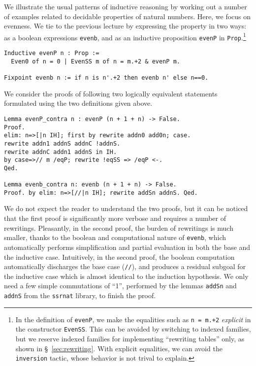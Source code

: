 \documentclass[blockstyle,preprint]{sigplanconf}
\newcommand{\is}[1]{\textcolor{blue}{(Ilya: {#1})}}
\newcommand{\an}[1]{\textcolor{red}{(Aleks: {#1})}}
\newcommand{\code}[1]{\lstinline{#1}}
\begin{document}
We illustrate the usual patterns of inductive reasoning by working out
a number of examples related to decidable properties of natural
numbers. Here, we focus on evenness. We tie to the previous lecture by
expressing the property in two ways: as a boolean expressions
\code{evenb}, and as an inductive proposition \code{evenP} in
\code{Prop}.\footnote{In the definition of \code{evenP}, we make the
  equalities such as \code{n = m.+2} \emph{explicit} in the
  constructor \code{EvenSS}. This can be avoided by switching to
  indexed families, but we reserve indexed families for implementing
  ``rewriting tables'' only, as shown in \S~\ref{sec:rewriting}.
%
  With explicit equalities, we can avoid the \code{inversion} tactic,
  whose behavior is not trival to explain.}
%
\begin{lstlisting}
Inductive evenP n : Prop :=
  Even0 of n = 0 | EvenSS m of n = m.+2 & evenP m.

Fixpoint evenb n := if n is n'.+2 then evenb n' else n==0.
\end{lstlisting}
%
We consider the proofs of following two logically equivalent
statements formulated using the two definitions given above.
%
%
%
\begin{lstlisting}
Lemma evenP_contra n : evenP (n + 1 + n) -> False.
Proof.
elim: n=>[|n IH]; first by rewrite addn0 add0n; case.
rewrite addn1 addnS addnC !addnS. 
rewrite addnC addn1 addnS in IH.
by case=>// m /eqP; rewrite !eqSS => /eqP <-.
Qed.

Lemma evenb_contra n: evenb (n + 1 + n) -> False.
Proof. by elim: n=>[//|n IH]; rewrite addSn addnS. Qed.
\end{lstlisting}
%
We do not expect the reader to understand the two proofs, but it can
be noticed that the first proof is significantly more verbose and
requires a number of rewritings. Pleasantly, in the second proof, the
burden of rewritings is much smaller, thanks to the boolean and
computational nature of \code{evenb}, which automatically performs
simplification and partial evaluation in both the base and the
inductive case. Intuitively, in the second proof, the boolean
computation automatically discharges the base case (\code{//}), and
produces a residual subgoal for the inductive case which is almost
identical to the induction hypothesis. We only need a few simple
commutations of ``1'', performed by the lemmas \code{addSn} and
\code{addnS} from the \code{ssrnat} library, to finish the proof.
\end{document}
